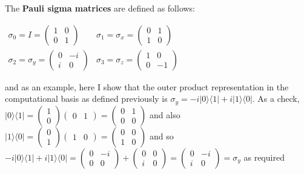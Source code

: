 \documentclass[12pt,a4paper]{article}
\numberwithin{equation}{section}
\begin{document}
The {\bf Pauli sigma matrices} are defined as follows: \begin{center} $\begin{matrix}
\sigma_0 = I = \begin{pmatrix} 1 & 0 \\ 0 & 1 \end{pmatrix} & \sigma_1 = \sigma_x = \begin{pmatrix} 0 & 1 \\ 1 & 0 \end{pmatrix} \\ \sigma_2 = \sigma_y = \begin{pmatrix} 0 & -i \\ i & 0 \end{pmatrix} & \sigma_3 = \sigma_z = \begin{pmatrix} 1 & 0 \\ 0 & -1 \end{pmatrix} \end{matrix}$ \end{center}
and as an example, here I show that the outer product representation in the computational basis as defined previously is $\sigma_y = -i|0\rangle\langle1| + i|1\rangle\langle0|$. As a check, $|0\rangle\langle1| = \begin{pmatrix} 1 \\ 0 \end{pmatrix} \begin{pmatrix} 0 & 1 \end{pmatrix} = \begin{pmatrix} 0 & 1 \\ 0 & 0 \end{pmatrix}$  and also $|1\rangle\langle0| = \begin{pmatrix} 0 \\ 1 \end{pmatrix} \begin{pmatrix} 1 & 0 \end{pmatrix} = \begin{pmatrix} 0 & 0 \\ 1 & 0 \end{pmatrix}$ and so $-i|0\rangle\langle1| + i|1\rangle\langle0| = \begin{pmatrix} 0 & -i \\ 0 & 0 \end{pmatrix} + \begin{pmatrix} 0 & 0 \\ i & 0 \end{pmatrix} = \begin{pmatrix} 0 & -i \\ i & 0 \end{pmatrix} = \sigma_y$ as required
\end{document}
